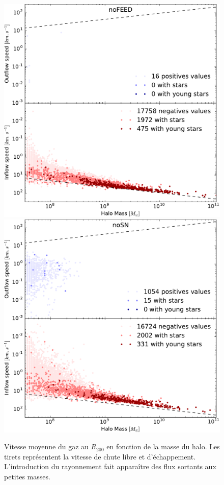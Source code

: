 \begin{figure}
	\centering
	\includegraphics[height=.45\textheight]{img/03/flux_speed_noFEED.pdf} 
	\includegraphics[height=.45\textheight]{img/03/flux_speed_noSN.pdf} 
    \caption[Vitesse du gaz au $R_{200}$ 1]{Vitesse moyenne du gaz au $R_{200}$ en fonction de la masse du halo.
    Les tirets représentent la vitesse de chute libre et d'échappement.
    L'introduction du rayonnement fait apparaître des flux sortants aux petites masses.
 	\label{fig:R200speed1}}
\end{figure}

